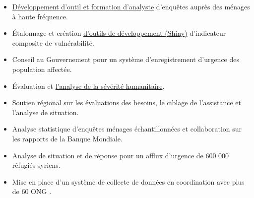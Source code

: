 \documentclass[10pt,a4paper,ragged2e,withhyper]{altacv}
\begin{document}
\begin{paracol}{2}
\divider

\begin{itemize}
\item  \href{https://unhcrverse.github.io/unhcrverse/learn/}{Développement d'outil et formation d'analyste} d'enquêtes auprès des ménages à haute fréquence.  
\item Étalonnage et création \href{https://rstudio.unhcr.org/SeverityIndex/}{d'outils de développement (Shiny)} d'indicateur composite de vulnérabilité.
\end{itemize}

\divider

\begin{itemize}
\item Conseil au Gouvernement pour un système d'enregistrement d'urgence des population affectée.  
\item Évaluation et  \href{https://humanitarian-user-group.github.io/post/compositeindicator/}{l'analyse de la sévérité humanitaire}.  
\end{itemize}

\divider

\begin{itemize}
\item Soutien régional sur les évaluations des besoins, le ciblage de l'assistance et l'analyse de situation.  
\item Analyse statistique d'enquêtes ménages échantillonnées et collaboration sur les rapports de la Banque Mondiale.
\end{itemize}

\divider

\begin{itemize}
\item Analyse de situation et de réponse pour un afflux d'urgence de 600 000 réfugiés syriens.
\item Mise en place d'un système de collecte de données en coordination avec plus de 60 ONG .
\end{itemize}


\end{paracol}
\end{document}
